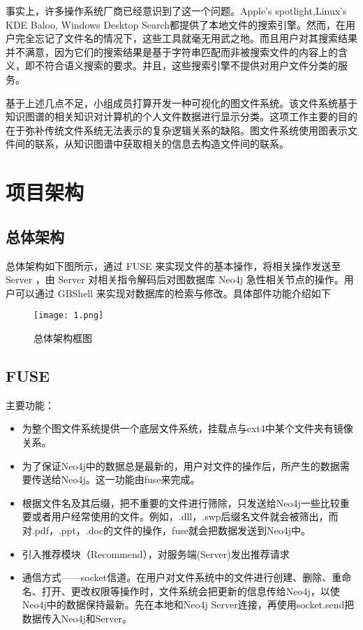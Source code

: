 \documentclass[UTF8]{ctexart}
\begin{document}
事实上，许多操作系统厂商已经意识到了这一个问题。Apple’s spotlight,Linux’s KDE Baloo, Windows Desktop Search都提供了本地文件的搜索引擎。然而，在用户完全忘记了文件名的情况下，这些工具就毫无用武之地。而且用户对其搜索结果并不满意，因为它们的搜索结果是基于字符串匹配而非被搜索文件的内容上的含义，即不符合语义搜索的要求。并且，这些搜索引擎不提供对用户文件分类的服务。

基于上述几点不足，小组成员打算开发一种可视化的图文件系统。该文件系统基于知识图谱的相关知识对计算机的个人文件数据进行显示分类。这项工作主要的目的在于弥补传统文件系统无法表示的复杂逻辑关系的缺陷。图文件系统使用图表示文件间的联系，从知识图谱中获取相关的信息去构造文件间的联系。

\section{项目架构}
\subsection{总体架构}
总体架构如下图所示，通过 FUSE 来实现文件的基本操作，将相关操作发送至 Server ，由 Server 对相关指令解码后对图数据库 Neo4j 急性相关节点的操作。用户可以通过 GBShell 来实现对数据库的检索与修改。具体部件功能介绍如下

\begin{figure}
\centering\texttt{[image: 1.png]}
\caption{总体架构框图}
\end{figure}

\subsection{FUSE}
主要功能：
\begin{itemize}
  \item 为整个图文件系统提供一个底层文件系统，挂载点与ext4中某个文件夹有镜像关系。
  \item 为了保证Neo4j中的数据总是最新的，用户对文件的操作后，所产生的数据需要传送给Neo4j。这一功能由fuse来完成。
\item 根据文件名及其后缀，把不重要的文件进行筛除，只发送给Neo4j一些比较重要或者用户经常使用的文件。例如，.dll，.swp后缀名文件就会被筛出，而对.pdf，.ppt，.doc的文件的操作，fuse就会把数据发送到Neo4j中。
\item 引入推荐模块（Recommend），对服务端(Server)发出推荐请求
\item 通信方式——socket信道。在用户对文件系统中的文件进行创建、删除、重命名、打开、更改权限等操作时，文件系统会把更新的信息传给Neo4j，以使Neo4j中的数据保持最新。先在本地和Neo4j Server连接，再使用socket.send把数据传入Neo4j和Server。
\end{itemize}
\end{document}
